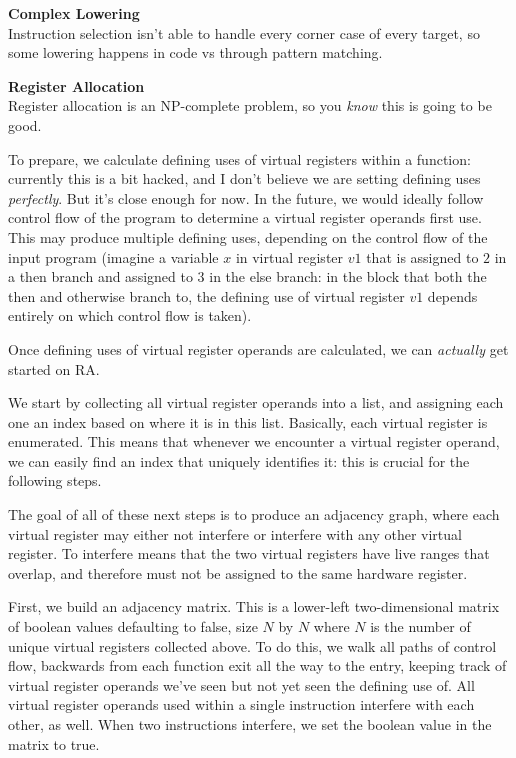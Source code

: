 \documentclass[12pt]{article}
\begin{document}
\noindent\textbf{Complex Lowering}\\
\noindent Instruction selection isn't able to handle every corner case of every target, so some lowering happens in code vs through pattern matching.

\noindent\textbf{Register Allocation}\\
\noindent Register allocation is an NP-complete problem, so you \emph{know} this is going to be good.

To prepare, we calculate defining uses of virtual registers within a function: currently this is a bit hacked, and I don't believe we are setting defining uses \emph{perfectly}. But it's close enough for now. In the future, we would ideally follow control flow of the program to determine a virtual register operands first use. This may produce multiple defining uses, depending on the control flow of the input program (imagine a variable $x$ in virtual register $v1$ that is assigned to $2$ in a then branch and assigned to $3$ in the else branch: in the block that both the then and otherwise branch to, the defining use of virtual register $v1$ depends entirely on which control flow is taken).

Once defining uses of virtual register operands are calculated, we can \emph{actually} get started on RA.

We start by collecting all virtual register operands into a list, and assigning each one an index based on where it is in this list. Basically, each virtual register is enumerated. This means that whenever we encounter a virtual register operand, we can easily find an index that uniquely identifies it: this is crucial for the following steps.

The goal of all of these next steps is to produce an adjacency graph, where each virtual register may either not interfere or interfere with any other virtual register. To interfere means that the two virtual registers have live ranges that overlap, and therefore must not be assigned to the same hardware register.

First, we build an adjacency matrix. This is a lower-left two-dimensional matrix of boolean values defaulting to false, size $N$ by $N$ where $N$ is the number of unique virtual registers collected above. To do this, we walk all paths of control flow, backwards from each function exit all the way to the entry, keeping track of virtual register operands we've seen but not yet seen the defining use of. All virtual register operands used within a single instruction interfere with each other, as well. When two instructions interfere, we set the boolean value in the matrix to true.
\end{document}
